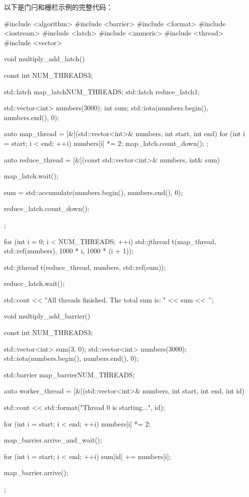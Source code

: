 以下是门闩和栅栏示例的完整代码：

\begin{cpp}
#include <algorithm>
#include <barrier>
#include <format>
#include <iostream>
#include <latch>
#include <numeric>
#include <thread>
#include <vector>

void multiply_add_latch() {
    const int NUM_THREADS{3};

    std::latch map_latch{NUM_THREADS};
    std::latch reduce_latch{1};

    std::vector<int> numbers(3000);
    int sum{};
    std::iota(numbers.begin(), numbers.end(), 0);

    auto map_thread = [&](std::vector<int>& numbers, int start, int
    end) {
        for (int i = start; i < end; ++i) {
            numbers[i] *= 2;
        }
        map_latch.count_down();
    };

    auto reduce_thread = [&](const std::vector<int>& numbers, int&
    sum) {
        map_latch.wait();

        sum = std::accumulate(numbers.begin(), numbers.end(), 0);

        reduce_latch.count_down();
    };

    for (int i = 0; i < NUM_THREADS; ++i) {
        std::jthread t(map_thread, std::ref(numbers), 1000 * i, 1000 *
        (i + 1));
    }

    std::jthread t(reduce_thread, numbers, std::ref(sum));

    reduce_latch.wait();

    std::cout << "All threads finished. The total sum is: " << sum << '\n';
}

void multiply_add_barrier() {
    const int NUM_THREADS{3};

    std::vector<int> sum(3, 0);
    std::vector<int> numbers(3000);
    std::iota(numbers.begin(), numbers.end(), 0);

    std::barrier map_barrier{NUM_THREADS};

    auto worker_thread = [&](std::vector<int>& numbers, int start, int
    end, int id) {
        std::cout << std::format("Thread {0} is starting...\n", id);

        for (int i = start; i < end; ++i) {
            numbers[i] *= 2;
        }

        map_barrier.arrive_and_wait();

        for (int i = start; i < end; ++i) {
            sum[id] += numbers[i];
        }

        map_barrier.arrive();
    };

}
\end{cpp}
